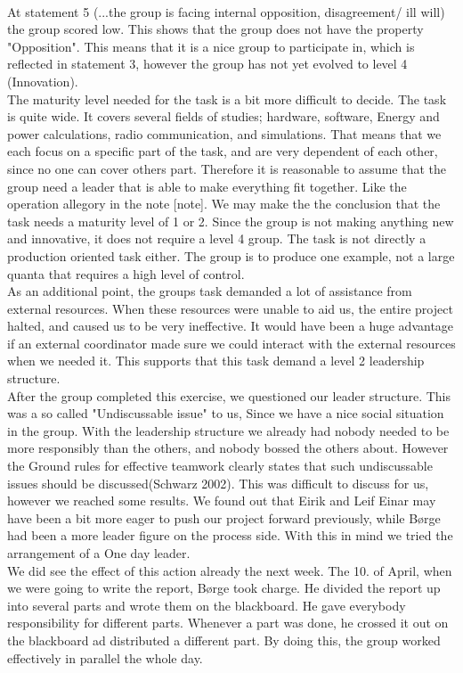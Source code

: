 \\
At statement 5 (...the group is facing internal opposition, disagreement/ ill will) the group scored low. This shows that the group does not have the property "Opposition". This means that it is a nice group to participate in, which is reflected in statement 3, however the group has not yet evolved to level 4 (Innovation).
\\	
The maturity level needed for the task is a bit more difficult to decide. The task is quite wide. It covers several fields of studies; hardware, software, Energy and power calculations, radio communication, and simulations. That means that we each focus on a specific part of the task, and are very dependent of each other, since no one can cover others part. Therefore it is reasonable to assume that the group need a leader that is able to make everything fit together. Like the operation allegory in the note [note]. We may make the the conclusion that the task needs a maturity level of 1 or 2. Since the group is not making anything new and innovative, it does not require a level 4 group. The task is not directly a production oriented task either. The group is to produce one example, not a large quanta that requires a high level of control. 
\\
As an additional point, the groups task demanded a lot of assistance from external resources. When these resources were unable to aid us, the entire project halted, and caused us to be very ineffective. It would have been a huge advantage if an external coordinator made sure we could interact with the external resources when we needed it. This supports that this task demand a level 2 leadership structure.
\\
After the group completed this exercise, we questioned our leader structure. This was a so called "Undiscussable issue" to us, Since we have a nice social situation in the group. With the leadership structure we already had nobody needed to be more responsibly than the others, and nobody bossed the others about. However the Ground rules for effective teamwork clearly states that such undiscussable issues should be discussed(Schwarz 2002). This was difficult to discuss for us, however we reached some results. We found out that Eirik and Leif Einar may have been a bit more eager to push our project forward previously, while Børge had been a more leader figure on the process side. With this in mind we tried the arrangement of a One day leader. 
\\
We did see the effect of this action already the next week. The 10. of April, when we were going to write the report, Børge took charge. He divided the report up into several parts and wrote them on the blackboard. He gave everybody responsibility for different parts. Whenever a part was done, he crossed it out on the blackboard ad distributed a different part. By doing this, the group worked effectively in parallel the whole day. 
